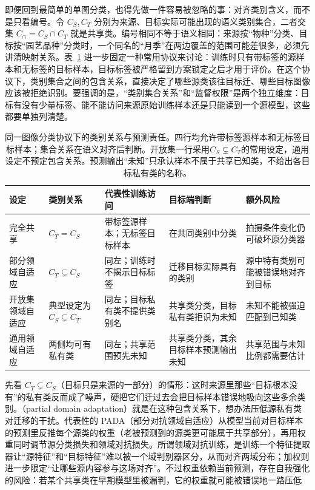 即便回到最简单的单图分类，也得先做一件容易被忽略的事：对齐类别含义，而不是只看编号。令 $C_S,C_T$ 分别为来源、目标实际可能出现的语义类别集合，二者交集 $C_{\cap}=C_S\cap C_T$ 就是共享类。编号相同不等于语义相同：来源按“物种”分类、目标按“园艺品种”分类时，一个同名的“月季”在两边覆盖的范围可能差很多，必须先讲清映射关系。表~\ref{tab:ket-transfer-class-relations} 进一步固定一种常用协议来讨论：训练时只有带标签的源样本和无标签的目标样本，目标标签被严格留到方案锁定之后才用于评价。在这个协议下，类别集合之间的包含关系，直接决定了哪些源类该往目标迁、哪些目标图像应该被拒绝识别。要强调的是，“类别集合关系”和“监督权限”是两个独立维度：目标有没有少量标签、能不能访问来源原始训练样本还是只能读到一个源模型，这些都要单独列清楚。

\begin{table}[htbp]
  \centering
  \small
  \setlength{\tabcolsep}{3pt}
  \begin{tabularx}{\linewidth}{p{19mm}p{25mm}p{29mm}XX}
    \toprule
    设定 & 类别关系 & 代表性训练访问 & 目标端判断 & 额外风险 \\
    \midrule
    完全共享 & $C_T=C_S$ & 带标签源样本；无标签目标样本 & 在共同类别中分类 & 拍摄条件变化仍可破坏原分类器 \\
    部分领域自适应 & $C_T\subsetneq C_S$ & 同左；训练时不揭示目标标签 & 迁移目标实际具有的类别 & 源中特有类别可能被错误地对齐到目标 \\
    开放集领域自适应 & 典型设定为$C_S\subsetneq C_T$ & 同左；目标私有类不提供类别名 & 共享类分类，目标私有类拒识为未知 & 未知不能被强迫匹配到已知类 \\
    通用领域自适应 & 两侧均可有私有类 & 同左；共享范围预先未知 & 共享类分类，其余目标样本预测输出未知 & 共享范围与未知比例都需要估计 \\
    \bottomrule
  \end{tabularx}
  \caption{同一图像分类协议下的类别关系与预测责任。四行均允许带标签源样本和无标签目标样本；集合关系在语义对齐后判断。开放集一行采用$C_S\subsetneq C_T$的常用设定，通用设定不预定包含关系。预测输出“未知”只承认样本不属于共享已知类，不给出各目标私有类的名称。}
  \label{tab:ket-transfer-class-relations}
\end{table}

先看 $C_T\subsetneq C_S$（目标只是来源的一部分）的情形：这时来源里那些“目标根本没有”的私有类反而成了噪声，硬把它们迁过去会把目标样本错误地吸向这些多余类别。（partial domain adaptation）就是在这种包含关系下，想办法压低源私有类对迁移的干扰。代表性的 PADA（部分对抗领域自适应）从模型当前对目标样本的预测里反推每个源类的权重（老被预测到的源类更可能属于共享部分），再用权重同时调节源分类损失和领域对抗损失。所谓领域对抗训练，是训练一个特征提取器让“源特征”和“目标特征”难以被一个域判别器区分，从而对齐两域分布；加权则进一步限定“让哪些源内容参与这场对齐”。不过权重依赖当前预测，存在自我强化的风险：若某个共享类在早期模型里被漏判，它的权重就可能被错误地一路压低

